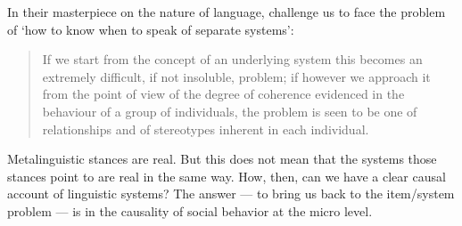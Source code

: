 In their masterpiece on the nature of language, \citet[8--9]{le_page_acts_1985} challenge us to face the problem of \textquoteleft how to 
know when to speak of separate systems': 



\begin{quotation}
If we start from the concept of an underlying system this becomes an 
extremely difficult, if not insoluble, problem; if however we approach 
it from the point of view of the degree of coherence evidenced in the 
behaviour of a group of individuals, the problem is seen to be one of 
relationships and of stereotypes inherent in each individual.  
\end{quotation}




Metalinguistic stances are real. But this does not mean that the systems 
those stances point to are real in the same way. How, then, can we have a clear 
causal account of linguistic systems? The answer --- to bring us back to the 
item/system problem --- is in the causality of social behavior at the micro 
level.






